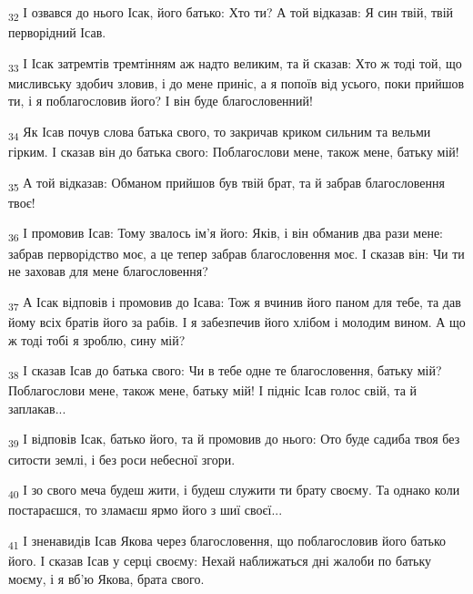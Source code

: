 \begin{tcolorbox}
\textsubscript{32} І озвався до нього Ісак, його батько: Хто ти? А той відказав: Я син твій, твій перворідний Ісав.
\end{tcolorbox}
\begin{tcolorbox}
\textsubscript{33} І Ісак затремтів тремтінням аж надто великим, та й сказав: Хто ж тоді той, що мисливську здобич зловив, і до мене приніс, а я попоїв від усього, поки прийшов ти, і я поблагословив його? І він буде благословенний!
\end{tcolorbox}
\begin{tcolorbox}
\textsubscript{34} Як Ісав почув слова батька свого, то закричав криком сильним та вельми гірким. І сказав він до батька свого: Поблагослови мене, також мене, батьку мій!
\end{tcolorbox}
\begin{tcolorbox}
\textsubscript{35} А той відказав: Обманом прийшов був твій брат, та й забрав благословення твоє!
\end{tcolorbox}
\begin{tcolorbox}
\textsubscript{36} І промовив Ісав: Тому звалось ім'я його: Яків, і він обманив два рази мене: забрав перворідство моє, а це тепер забрав благословення моє. І сказав він: Чи ти не заховав для мене благословення?
\end{tcolorbox}
\begin{tcolorbox}
\textsubscript{37} А Ісак відповів і промовив до Ісава: Тож я вчинив його паном для тебе, та дав йому всіх братів його за рабів. І я забезпечив його хлібом і молодим вином. А що ж тоді тобі я зроблю, сину мій?
\end{tcolorbox}
\begin{tcolorbox}
\textsubscript{38} І сказав Ісав до батька свого: Чи в тебе одне те благословення, батьку мій? Поблагослови мене, також мене, батьку мій! І підніс Ісав голос свій, та й заплакав...
\end{tcolorbox}
\begin{tcolorbox}
\textsubscript{39} І відповів Ісак, батько його, та й промовив до нього: Ото буде садиба твоя без ситости землі, і без роси небесної згори.
\end{tcolorbox}
\begin{tcolorbox}
\textsubscript{40} І зо свого меча будеш жити, і будеш служити ти брату своєму. Та однако коли постараєшся, то зламаєш ярмо його з шиї своєї...
\end{tcolorbox}
\begin{tcolorbox}
\textsubscript{41} І зненавидів Ісав Якова через благословення, що поблагословив його батько його. І сказав Ісав у серці своєму: Нехай наближаться дні жалоби по батьку моєму, і я вб'ю Якова, брата свого.
\end{tcolorbox}
